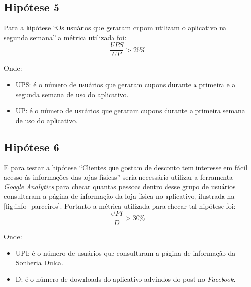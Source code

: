 \subsection{Hipótese 5}
\label{cha:hip_5}
Para a hipótese \enquote{Os usuários que geraram cupom utilizam o aplicativo na segunda semana} a métrica utilizada foi:
\[\dfrac{UPS}{UP} > 25\%\]

Onde: 
\begin{itemize}
\item UPS: é o número de usuários que geraram cupons durante a primeira e a segunda semana de uso do aplicativo.
\item UP: é o número de usuários que geraram cupons durante a primeira semana de uso do aplicativo.
\end{itemize}

\subsection{Hipótese 6}
\label{cha:hip_6}
E para testar a hipótese \enquote{Clientes que gostam de desconto tem interesse em fácil acesso às informações das lojas físicas} seria necessário utilizar a ferramenta \textit{Google Analytics} para checar quantas pessoas dentro desse grupo de usuários consultaram a página de informação da loja física no aplicativo, ilustrada na \autoref{fig:info_parceiros}. Portanto a métrica utilizada para checar tal hipótese foi:
\[\dfrac{UPI}{D} > 30\%\]

Onde: 
\begin{itemize}
\item UPI: é o número de usuários que consultaram a página de informação da Sonheria Dulca.
\item D: é o número de downloads do aplicativo advindos do post no \textit{Facebook}.
\end{itemize}

